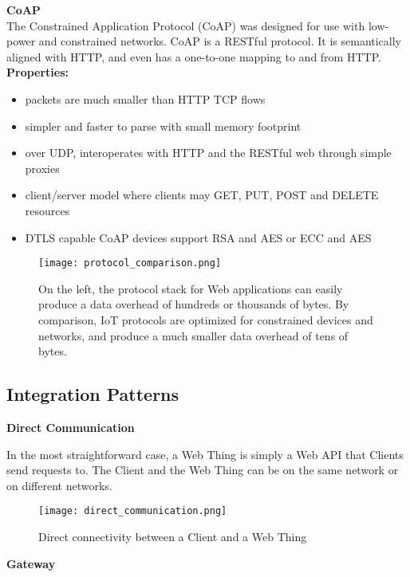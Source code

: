 \textbf{CoAP}\\

The Constrained Application Protocol (CoAP) was designed for use with low-power
and constrained networks. CoAP is a RESTful protocol. It is semantically
aligned with HTTP, and even has a one-to-one mapping to and from HTTP.\\

\textbf{Properties:}

\begin{itemize}
  \item packets are much smaller than HTTP TCP flows
  \item simpler and faster to parse with small memory footprint
  \item over UDP, interoperates with HTTP and the RESTful web through simple
proxies
  \item client/server model where clients may GET, PUT, POST and DELETE
resources
  \item DTLS capable CoAP devices support RSA and AES or ECC and AES
\end{itemize}

\begin{figure}[H]
  \centering
  \texttt{[image: protocol\_comparison.png]}
  \caption{On the left, the protocol stack for Web applications can easily
produce a data overhead of hundreds or thousands of bytes.
By comparison, IoT protocols are optimized for constrained devices and
networks, and produce a much smaller data overhead of tens of bytes.}
  \label{fig:protocol_comparison}
\end{figure}

\subsection{Integration Patterns}

\textbf{Direct Communication}

In the most straightforward case, a Web Thing is simply a Web API that Clients
send requests to.
The Client and the Web Thing can be on the same network or on different
networks.

\begin{figure}[H]
  \centering
  \texttt{[image: direct\_communication.png]}
  \caption{Direct connectivity between a Client and a Web Thing}
  \label{fig:direct_communication}
\end{figure}

\textbf{Gateway}

